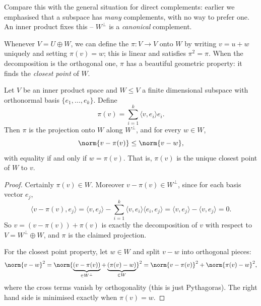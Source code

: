 \documentclass[a4paper]{scrartcl}
\begin{document}
Compare this with the general situation for direct complements: earlier we emphasised that a subspace has \emph{many} complements, with no way to prefer one. An inner product fixes this -- $W^\perp$ is a \emph{canonical} complement.

Whenever $V = U \oplus W$, we can define the  $\pi: V \rightarrow V$ onto $W$ by writing $v = u + w$ uniquely and setting $\pi(v) = w$; this is linear and satisfies $\pi^2 = \pi$. When the decomposition is the orthogonal one, $\pi$ has a beautiful geometric property: it finds the \emph{closest point} of $W$.

\begin{center}
\end{center}

\begin{proposition}
    Let $V$ be an inner product space and $W \leq V$ a finite dimensional subspace with orthonormal basis $\{e_1, \dots, e_k\}$. Define
    $$
    \pi(v) = \sum_{i = 1}^k \langle v, e_i \rangle e_i.
    $$
    Then $\pi$ is the projection onto $W$ along $W^\perp$, and for every $w \in W$,
    $$
    \norm{v - \pi(v)} \leq \norm{v - w},
    $$
    with equality if and only if $w = \pi(v)$. That is, $\pi(v)$ is the unique closest point of $W$ to $v$.
\end{proposition}
\begin{proof}
    Certainly $\pi(v) \in W$. Moreover $v - \pi(v) \in W^\perp$, since for each basis vector $e_j$,
    $$
    \langle v - \pi(v), e_j \rangle = \langle v, e_j \rangle - \sum_{i = 1}^k \langle v, e_i \rangle \langle e_i, e_j \rangle = \langle v, e_j\rangle - \langle v, e_j \rangle = 0.
    $$
    So $v = (v - \pi(v)) + \pi(v)$ is exactly the decomposition of $v$ with respect to $V = W^\perp \oplus W$, and $\pi$ is the claimed projection.

    For the closest point property, let $w \in W$ and split $v - w$ into orthogonal pieces:
    $$
    \norm{v - w}^2 = \norm{\underbrace{(v - \pi(v))}_{\in W^\perp} + \underbrace{(\pi(v) - w)}_{\in W}}^2 = \norm{v - \pi(v)}^2 + \norm{\pi(v) - w}^2,
    $$
    where the cross terms vanish by orthogonality (this is just Pythagoras). The right hand side is minimised exactly when $\pi(v) = w$.
\end{proof}
\end{document}
